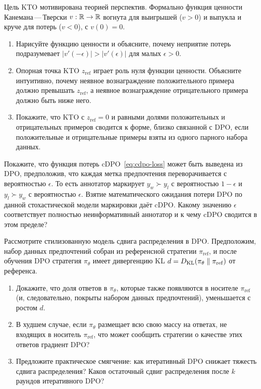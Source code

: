 \begin{exercise}
\label{ex:kto-prospect}
Цель KTO мотивирована теорией перспектив. Формально функция ценности Канемана\,---\,Тверски $v : \mathbb{R} \to \mathbb{R}$ вогнута для выигрышей ($v > 0$) и выпукла и круче для потерь ($v < 0$), с $v(0) = 0$.
\begin{enumerate}
  \item Нарисуйте функцию ценности и объясните, почему неприятие потерь подразумевает $|v'(-\epsilon)| > |v'(\epsilon)|$ для малых $\epsilon > 0$.
  \item Опорная точка KTO $z_\mathrm{ref}$ играет роль нуля функции ценности. Объясните интуитивно, почему неявное вознаграждение положительного примера должно превышать $z_\mathrm{ref}$, а неявное вознаграждение отрицательного примера должно быть ниже него.
  \item Покажите, что KTO с $z_\mathrm{ref} = 0$ и равными долями положительных и отрицательных примеров сводится к форме, близко связанной с DPO, если положительные и отрицательные примеры взяты из одного парного набора данных.
\end{enumerate}
\end{exercise}

\begin{exercise}
\label{ex:cdpo-label-smooth}
Покажите, что функция потерь cDPO~\eqref{eq:cdpo-loss} может быть выведена из DPO, предположив, что каждая метка предпочтения переворачивается с вероятностью $\epsilon$. То есть аннотатор маркирует $y_w \succ y_l$ с вероятностью $1-\epsilon$ и $y_l \succ y_w$ с вероятностью $\epsilon$. Взятие математического ожидания потери DPO по данной стохастической модели маркировки даёт cDPO. Какому значению $\epsilon$ соответствует полностью неинформативный аннотатор и к чему cDPO сводится в этом пределе?
\end{exercise}

\begin{exercise}
\label{ex:distribution-shift}
Рассмотрите стилизованную модель сдвига распределения в DPO. Предположим, набор данных предпочтений собран из референсной стратегии $\pi_\mathrm{ref}$, и после обучения DPO стратегия $\pi_\theta$ имеет дивергенцию KL $d = D_{\mathrm{KL}}\!\left(\pi_\theta\;\|\;\pi_\mathrm{ref}\right)$ от референса.
\begin{enumerate}
  \item Докажите, что доля ответов в $\pi_\theta$, которые также появляются в носителе $\pi_\mathrm{ref}$ (и, следовательно, покрыты набором данных предпочтений), уменьшается с ростом $d$.
  \item В худшем случае, если $\pi_\theta$ размещает всю свою массу на ответах, не входящих в носитель $\pi_\mathrm{ref}$, что может сообщить стратегии о качестве этих ответов градиент DPO?
  \item Предложите практическое смягчение: как итеративный DPO снижает тяжесть сдвига распределения? Каков остаточный сдвиг распределения после $k$ раундов итеративного DPO?
\end{enumerate}
\end{exercise}

